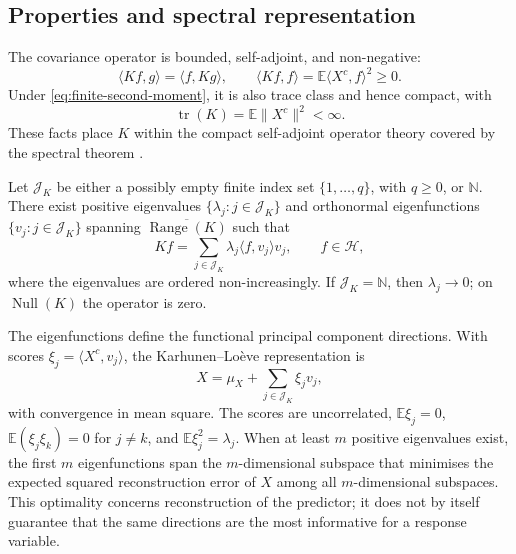 \subsection{Properties and spectral representation}

The covariance operator is bounded, self-adjoint, and non-negative:
\begin{equation}
    \langle Kf,g\rangle=\langle f,Kg\rangle,
    \qquad
    \langle Kf,f\rangle
    =\mathbb E\langle X^c,f\rangle^2\geq0.
    \label{eq:covariance-properties}
\end{equation}
Under \eqref{eq:finite-second-moment}, it is also trace class and hence compact, with
\begin{equation}
    \operatorname{tr}(K)=\mathbb E\|X^c\|^2<\infty.
    \label{eq:covariance-trace}
\end{equation}
These facts place $K$ within the compact self-adjoint operator theory covered by the spectral theorem \parencite{lin_mit_18102_2021,hsing_eubank_2015,horvath_kokoszka_2012}.

\begin{proposition}
Let $\mathcal J_K$ be either a possibly empty finite index set
$\{1,\ldots,q\}$, with $q\geq0$, or $\mathbb N$.  There exist positive eigenvalues
$\{\lambda_j:j\in\mathcal J_K\}$ and orthonormal eigenfunctions
$\{v_j:j\in\mathcal J_K\}$ spanning
$\overline{\operatorname{Range}(K)}$ such that
\begin{equation}
    Kf=\sum_{j\in\mathcal J_K}\lambda_j\langle f,v_j\rangle v_j,
    \qquad f\in\mathcal H,
    \label{eq:covariance-spectral-representation}
\end{equation}
where the eigenvalues are ordered non-increasingly.  If $\mathcal J_K=\mathbb N$,
then $\lambda_j\rightarrow0$; on $\operatorname{Null}(K)$ the operator is zero.
\end{proposition}

The eigenfunctions define the functional principal component directions. With scores $\xi_j=\langle X^c,v_j\rangle$, the Karhunen--Lo\`eve representation is
\begin{equation}
    X=\mu_X+\sum_{j\in\mathcal J_K}\xi_jv_j,
    \label{eq:karhunen-loeve}
\end{equation}
with convergence in mean square. The scores are uncorrelated, $\mathbb E\xi_j=0$, $\mathbb E(\xi_j\xi_k)=0$ for $j\neq k$, and $\mathbb E\xi_j^2=\lambda_j$. When at least $m$ positive eigenvalues exist, the first $m$ eigenfunctions span the $m$-dimensional subspace that minimises the expected squared reconstruction error of $X$ among all $m$-dimensional subspaces. This optimality concerns reconstruction of the predictor; it does not by itself guarantee that the same directions are the most informative for a response variable.

